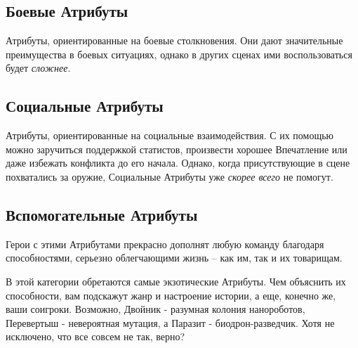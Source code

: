 
\subsection{Боевые Атрибуты}
Атрибуты, ориентированные на боевые столкновения. Они дают значительные преимущества в боевых ситуациях, однако в других сценах ими воспользоваться будет \textit{сложнее}.

\subsection{Социальные Атрибуты}
Атрибуты, ориентированные на социальные взаимодействия. С их помощью можно заручиться поддержкой статистов, произвести хорошее Впечатление или даже избежать конфликта до его начала. Однако, когда присутствующие в сцене похватались за оружие, Социальные Атрибуты уже \textit{скорее всего} не помогут.

\subsection{Вспомогательные Атрибуты}
Герои с этими Атрибутами прекрасно дополнят любую команду благодаря способностями, серьезно облегчающими жизнь – как им, так и их товарищам.
\begin{tcolorbox}
    В этой категории обретаются самые экзотические Атрибуты. Чем объяснить их способности, вам подскажут жанр и настроение истории, а еще, конечно же, ваши соигроки. Возможно, Двойник - разумная колония нанороботов, Перевертыш - невероятная мутация, а Паразит - биодрон-разведчик.  Хотя не исключено, что все совсем не так, верно? 
\end{tcolorbox}

\printindex[attributes]
